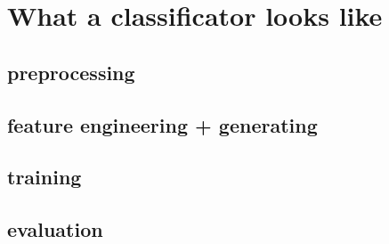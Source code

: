 \chapter{What a classificator looks like}

\section{preprocessing}

\section{feature engineering + generating}

\section{training}

\section{evaluation}
